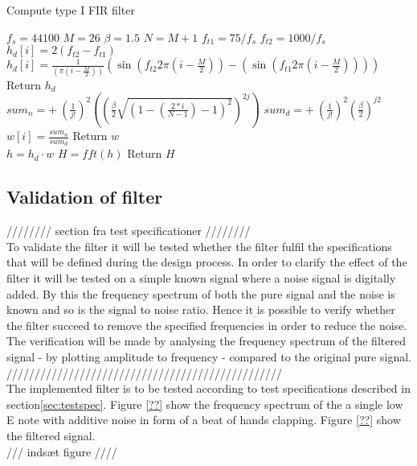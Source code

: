 \begin{algorithm}[H]
\caption{Compute type I FIR filter}
\label{alg:FIR}
\begin{algorithmic}[1] 
\State $f_s= 44100$ 
\State $M = 26$  
\State $\beta = 1.5$ 
\State $N = M+1$ 
\State $f_{t1} = 75/f_s$ 
\State $f_{t2} = 1000/f_s$ 
\\
        		\State $h_d[i] = 2(f_{t2} - f_{t1})$
        	\Else 
        		\State  $h_d[i] = \frac{1}{ (\pi (i - \frac{M}{2}))}(\sin(f_{t2} 2 \pi (i - \frac{M}{2})) - (\sin(f_{t1} 2 \pi (i - \frac{M}{2}))))$ 
        	\EndIf 
	\EndFor
	\State Return $h_d$
\EndProcedure
\\
			\State $ sum_n = + \ (\frac{1}{j!})^2 \left( \left( \frac{\beta}{2} \sqrt{\left(1 - \left( \frac{2*i}{N-1}\right) - 1\right)^2}\right)^{2j}\right)$
			\State $ sum_d = + \ (\frac{1}{j!})^2 \left( \frac{\beta}{2}\right)^{j2}$
		\EndFor
		\State $w[i]=\frac{sum_n}{sum_d}$
	\EndFor
	\State Return $w$
\EndProcedure
\\
	\State $h = h_d \cdot w$ 
	\State $H = fft(h)$ 
	\State Return $H$
\EndProcedure

\end{algorithmic}
\end{algorithm}

\subsection{Validation of filter}
//////// section fra test specificationer ////////\\
To validate the filter it will be tested whether the filter fulfil the specifications that will be defined during the design process. In order to clarify the effect of the filter it will be tested on a simple known signal where a noise signal is digitally added. By this the frequency spectrum of both the pure signal and the noise is known and so is the signal to noise ratio. Hence it is possible to verify whether the filter succeed to remove the specified frequencies in order to reduce the noise. The verification will be made by analysing the frequency spectrum of the filtered signal - by plotting amplitude to frequency - compared to the original pure signal. \\
/////////////////////////////////////////////////\\
The implemented filter is to be tested according to test specifications described in section\ref{sec:testspec}. Figure \ref{??} show the frequency spectrum of the a single low E note with additive noise in form of a beat of hands clapping. Figure \ref{??} show the filtered signal.\\
/// indsæt figure ////

